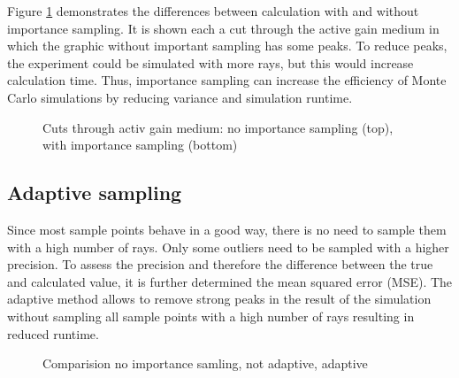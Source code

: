 Figure \ref{graphic:importance} demonstrates
the differences between calculation with and without
importance sampling. It is shown each a cut through the active
gain medium in which the graphic without important
sampling has some peaks. To reduce peaks, the experiment
could be simulated with more rays, but this would increase
calculation time. Thus, importance sampling can increase the
efficiency of Monte Carlo simulations by reducing variance 
and simulation runtime. 
\begin{figure}[H]
  \centerline
  {}
  \caption{Cuts through activ gain medium: no importance sampling (top), with importance sampling (bottom)}
  \label{graphic:importance}
\end{figure}

\subsection{Adaptive sampling}
\label{subsec:adaptive_sampling}
Since most sample points behave in a good way, there is no need
to sample them with a high number of rays. Only some outliers need to
be sampled with a higher precision. To assess the precision
and therefore the difference between the true and calculated value,
it is further determined the mean squared error (MSE).
The adaptive method allows to remove strong peaks in the result
of the simulation without sampling all sample points with
a high number of rays resulting in reduced runtime.
\begin{figure}[H]
  \centerline{
    }
  \caption{Comparision no importance samling, not adaptive, adaptive}
  \label{plot:adaptive}
\end{figure}

